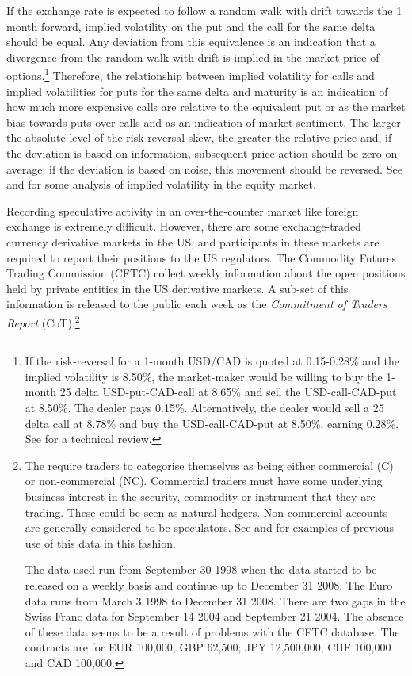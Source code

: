 \documentclass{article}
\begin{document}
If the exchange rate is expected to follow a random walk with drift towards the 1 month forward, implied volatility on the put and the call for the same delta should be equal.  Any deviation from this equivalence is an indication that a divergence from the random walk with drift is implied in the market price of options.\footnote{If the risk-reversal for a 1-month USD/CAD is quoted at 0.15-0.28\% and the implied volatility is 8.50\%, the market-maker would be willing to buy the 1-month 25 delta USD-put-CAD-call at 8.65\% and sell the USD-call-CAD-put at 8.50\%.  The dealer pays 0.15\%.  Alternatively, the dealer would sell a 25 delta call at 8.78\% and buy the USD-call-CAD-put at 8.50\%, earning 0.28\%. See \citet{Global} for a technical review. }  Therefore, the relationship between implied volatility for calls and implied volatilities for puts for the same delta and maturity is an indication of how much more expensive calls are relative to the equivalent put or as the market bias towards puts over calls and as an indication of market sentiment.  The larger the absolute level of the risk-reversal skew, the greater the relative price and, if the deviation is based on information, subsequent price action should be zero on average; if the deviation is based on noise, this movement should be reversed.  See \citet{Yan2011} and \citet{FengZhangFriesen} for some analysis of implied volatility in the equity market. 

Recording speculative activity in an over-the-counter market like foreign exchange is extremely difficult.  However, there are some exchange-traded currency derivative markets in the US, and participants in these markets are required to report their positions to the US regulators.  The Commodity Futures Trading Commission (CFTC) collect weekly information about the open positions held by private entities in the US derivative markets.   A sub-set of this information is released to the public each week as the \emph{Commitment of Traders Report} (CoT).\footnote{The \citet{cot} require traders to categorise themselves as being either commercial (C) or non-commercial (NC).  Commercial traders must have some underlying business interest in the security, commodity or instrument that they are trading.  These could be seen as natural hedgers.  Non-commercial accounts are generally considered to be speculators.  See \citet{FuturesSanders} and \citet{FuturesWang} for examples of previous use of this data in this fashion. 
 
The data used run from September 30 1998 when the data started to be released on a weekly basis and continue up to December 31 2008.  The Euro data runs from March 3 1998 to December 31 2008.  There are two gaps in the Swiss Franc data for September 14 2004 and September 21 2004.  The absence of these data seems to be a result of problems with the CFTC database.  The contracts are for EUR 100,000; GBP 62,500; JPY 12,500,000; CHF 100,000 and CAD 100,000.}  
\end{document}
